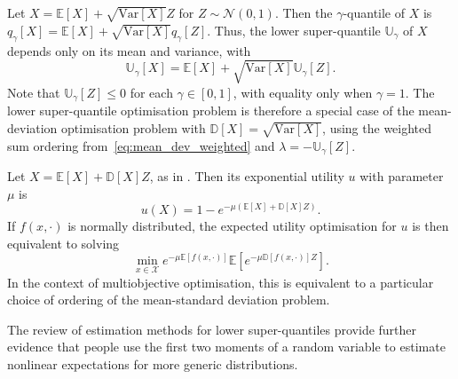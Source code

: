 \documentclass[main.tex]{subfiles}
\begin{document}
\begin{example}\label{ex:avar_normal}
  Let $X=\mathbb{E}[X]+ \sqrt{\mbox{Var}[X]} Z$ for $Z\sim\mathcal{N}(0,1)$.
  Then the $\gamma$-quantile of $X$ is
  $q_\gamma[X] = \mathbb{E}[X] + \sqrt{\mbox{Var}[X]} q_\gamma[Z]$.
  Thus, the lower super-quantile $\mathbb{U}_\gamma$ of $X$ depends only on
  its mean and variance, with
  \begin{equation}
    \mathbb{U}_\gamma[X] =  \mathbb{E}[X]
    + \sqrt{\mbox{Var}[X]} \mathbb{U}_\gamma[Z].
  \end{equation}
  Note that $\mathbb{U}_\gamma[Z]\leq 0$ for each $\gamma\in[0,1]$,
  with equality only when $\gamma=1$.
  The lower super-quantile optimisation problem is therefore
  a special case of the mean-deviation optimisation problem
  with $\mathbb{D}[X]=\sqrt{\mbox{Var}[X]}$,
  using the weighted sum ordering from~\eqref{eq:mean_dev_weighted} and
  $\lambda = -\mathbb{U}_\gamma[Z]$.
\end{example}

\begin{example}
  Let $X=\mathbb{E}[X]+ \mathbb{D}[X] Z$, as in .
  Then its exponential utility $u$ with parameter $\mu$
  is
  \begin{equation}
    u(X) = 1 - e^{-\mu (\mathbb{E}[X] +
      \mathbb{D}[X] Z)}.
  \end{equation}
  If $f(x,\cdot)$ is normally distributed, the expected utility
  optimisation for $u$ is then equivalent to solving
  \begin{equation}
    \min_{x\in\mathcal{X}}  e^{-\mu\mathbb{E}[f(x,\cdot)]}
    \mathbb{E} \left[ e^{-\mu \mathbb{D}[f(x,\cdot)] Z} \right].
  \end{equation}
  In the context of multiobjective optimisation, this is equivalent to
  a particular choice of ordering of the mean-standard deviation problem.
\end{example}

The review \citep{nadarajah2014estimation} of estimation methods for
lower super-quantiles provide further evidence that people use
the first two moments of a random variable to estimate nonlinear
expectations for more generic distributions.
\end{document}
